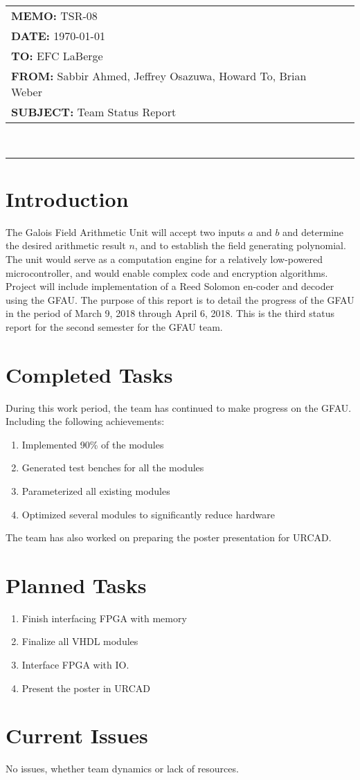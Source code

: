 \documentclass[paper=usletter, fontsize=12pt]{article}
\newcommand{\Sabbir}{Sabbir Ahmed}
\newcommand{\Jeffrey}{Jeffrey Osazuwa}
\newcommand{\Howard}{Howard To}
\newcommand{\Brian}{Brian Weber}
\newcommand{\documentinfo}[5]{
    \begin{centering}
        \parbox{6.8in}{
        \begin{spacing}{1}
            \begin{flushleft}
                \begin{tabular}{l l}
                    #1 \\
                    #2 \\
                    #3 \\
                    #4 \\
                    #5 \\
                \end{tabular} \\
                \rule{\textwidth}{1pt}
            \end{flushleft}
        \end{spacing}
        }
    \end{centering}
}
\begin{document}
    \documentinfo{\textbf{MEMO:} TSR-08}{\textbf{DATE: }{\today}}{\textbf{TO: } EFC LaBerge}{\textbf{FROM: }\Sabbir, \Jeffrey, \Howard, \Brian}{\textbf{SUBJECT: } Team Status Report}

    \vspace{-0.3in}
    \section{Introduction}
   The  Galois  Field  Arithmetic  Unit  will  accept  two  inputs $a$  and $b$  and  determine  the  desired arithmetic result $n$, and to establish the field generating polynomial.  The unit would serve as a computation engine for a relatively low-powered microcontroller, and would enable complex code and encryption algorithms.  Project will include implementation of a Reed Solomon en-coder and decoder using the GFAU. The purpose of this report is to detail the progress of the GFAU in the period of March 9, 2018 through April 6, 2018. This is the third status report for the second semester for the GFAU team.


    \section{Completed Tasks}
    During this work period, the team has continued to make progress on the GFAU. Including the following achievements:
    \begin{enumerate}

        \item Implemented 90\% of the modules
        \item Generated test benches for all the modules
        \item Parameterized all existing modules
        \item Optimized several modules to significantly reduce hardware

    \end{enumerate}
    The team has also worked on preparing the poster presentation for URCAD.

    \section{Planned Tasks}
    \begin{enumerate}

        \item Finish interfacing FPGA with memory
        \item Finalize all VHDL modules
        \item Interface FPGA with IO.
        \item Present the poster in URCAD

    \end{enumerate}


    \section{Current Issues}
  No issues, whether team dynamics or lack of resources.
\end{document}
